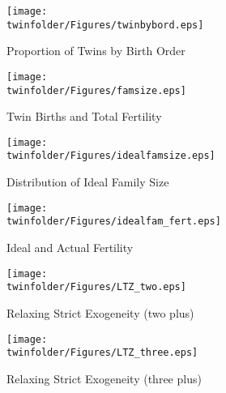 \begin{figure}[htpb!]
\begin{center}
\caption{Proportion of Twins by Birth Order}
\label{TWINfig:bord}
\texttt{[image: \\twinfolder/Figures/twinbybord.eps]} 
\end{center}
\end{figure}

\begin{figure}[htpb!]
\begin{center}
\caption{Twin Births and Total Fertility}
\label{TWINfig:births}
\texttt{[image: \\twinfolder/Figures/famsize.eps]} 
\end{center}
\end{figure}

\begin{figure}[htpb!]
\begin{center}
\caption{Distribution of Ideal Family Size}
\label{TWINfig:ideal}
\texttt{[image: \\twinfolder/Figures/idealfamsize.eps]} 
\end{center}
\end{figure}

\begin{figure}[htpb!]
\begin{center}
\caption{Ideal and Actual Fertility}
\label{TWINfig:idealactual}
\texttt{[image: \\twinfolder/Figures/idealfam\_fert.eps]} 
\end{center}
\end{figure}

\begin{figure}[htpb!]
\begin{center}
\caption{Relaxing Strict Exogeneity (two plus)}
\label{TWINfig:ltz2}
\texttt{[image: \\twinfolder/Figures/LTZ\_two.eps]}
\vspace{-8mm}
\end{center}
\end{figure}

\begin{figure}[htpb!]
\begin{center}
\caption{Relaxing Strict Exogeneity (three plus)}
\label{TWINfig:ltz3}
\texttt{[image: \\twinfolder/Figures/LTZ\_three.eps]} 
\end{center}
\end{figure}



